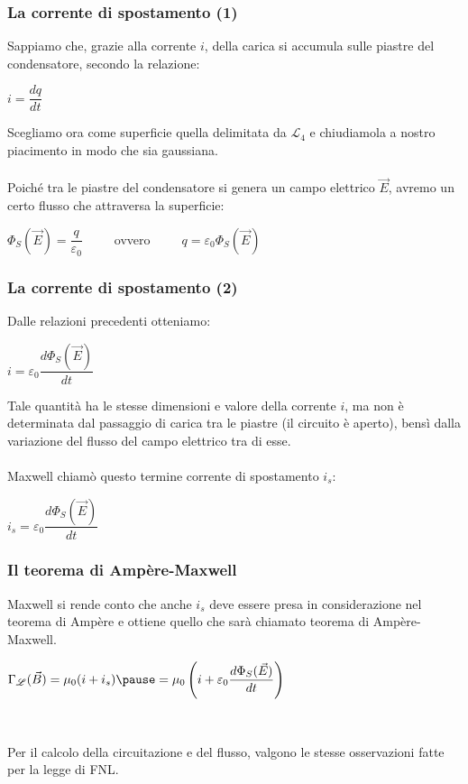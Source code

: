 \documentclass[]{beamer}
\theoremstyle{plain}
\begin{document}
\begin{frame}
  \frametitle{La corrente di spostamento (1)}
  Sappiamo che, grazie alla corrente $ i $, \alert<1>{della carica si accumula sulle piastre del condensatore}, secondo la relazione:
  \begin{center}
  $ i = \dfrac{dq}{dt} $
  \end{center}\pause
  
  Scegliamo ora come \alert<2>{superficie} quella \alert<2>{delimitata da $ \mathscr{L}_4 $} e chiudiamola a nostro piacimento in modo che sia gaussiana.\\~\pause\\  
  Poiché tra le piastre del condensatore si genera un campo elettrico $ \vec{E} $, avremo un certo \alert<3>{flusso che attraversa la superficie}:
  \begin{center}
  $ \Phi_S(\vec{E}) = \dfrac{q}{\varepsilon_0} $~~~~~ovvero~~~~~$ q = \varepsilon_0 \Phi_S(\vec{E}) $
  \end{center}
\end{frame}

\begin{frame}
  \frametitle{La corrente di spostamento (2)}
  Dalle relazioni precedenti otteniamo:
  \begin{center}
  $ i = \varepsilon_0 \dfrac{d\Phi_S(\vec{E})}{dt} $
  \end{center}\pause
  Tale quantità ha le stesse dimensioni e valore della corrente $ i $, ma \alert<2>{non è determinata dal passaggio di carica tra le piastre} (il circuito è aperto), \alert<2>{bensì dalla variazione del flusso del campo elettrico tra di esse}.\\~\pause\\
Maxwell chiamò questo termine \alert<3>{corrente di spostamento $ i_s $}:
  \begin{center}
  \colorbox{blue!30}{$ i_s = \varepsilon_0 \dfrac{d\Phi_S(\vec{E})}{dt} $}
  \end{center}
\end{frame}


\begin{frame}
\frametitle{Il teorema di Ampère-Maxwell}
Maxwell si rende conto che anche \alert{$ i_s $ deve essere presa in considerazione nel teorema di Ampère} e ottiene quello che sarà chiamato teorema di Ampère-Maxwell.
\begin{center}
\colorbox{blue!30}{$ \Gamma_\mathscr{L} (\vec{B}) = \mu_0 (i+i_s) \pause = \mu_0 \left( i + \varepsilon_0 \dfrac{d\Phi_S(\vec{E})}{dt} \right) $}
\end{center}\pause

~

Per il calcolo della circuitazione e del flusso, valgono le stesse osservazioni fatte per la legge di FNL.
\end{frame}
\end{document}
